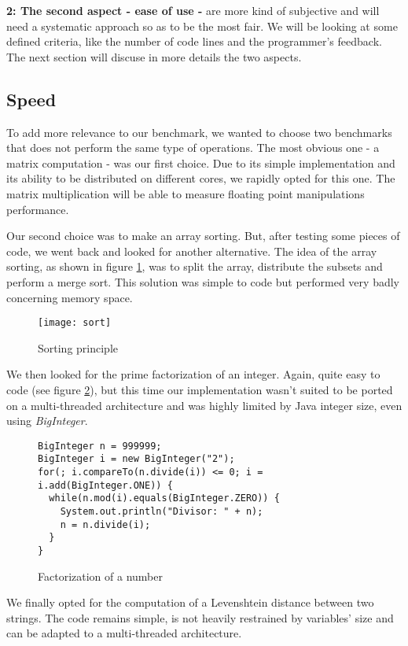 \textbf{2: The second aspect - ease of use -} are more kind of subjective and will need a systematic approach so as to be the most fair. We will be looking at some defined criteria, like the number of code lines and the programmer's feedback. The next section will discuse in more details the two aspects.

\subsection{Speed} \label{subsection speed}

To add more relevance to our benchmark, we wanted to choose two benchmarks that does not perform the same type of operations. The most obvious one - a matrix computation - was our first choice. Due to its simple implementation and its ability to be distributed on different cores, we rapidly opted for this one. The matrix multiplication will be able to measure floating point manipulations performance. 

Our second choice was to make an array sorting. But, after testing some pieces of code, we went back and looked for another alternative. The idea of the array sorting, as shown in figure \ref{fig sort}, was to split the array, distribute the subsets and perform a merge sort. This solution was simple to code but performed very badly concerning memory space.

\begin{figure}[h!]
\centering
\texttt{[image: sort]}
\caption{Sorting principle}
\label{fig sort}
\end{figure}

We then looked for the prime factorization of an integer. Again, quite easy to code (see figure \ref{listing factor}), but this time our implementation wasn't suited to be ported on a multi-threaded architecture and was highly limited by Java integer size, even using \textit{BigInteger}.

\begin{figure}
	\begin{lstlisting}
BigInteger n = 999999;
BigInteger i = new BigInteger("2");
for(; i.compareTo(n.divide(i)) <= 0; i = i.add(BigInteger.ONE)) {
  while(n.mod(i).equals(BigInteger.ZERO)) {
    System.out.println("Divisor: " + n);
    n = n.divide(i);
  }
}
	\end{lstlisting}
\caption{Factorization of a number}
\label{listing factor}
\end{figure}

We finally opted for the computation of a Levenshtein distance between two strings. The code remains simple, is not heavily restrained by variables' size and can be adapted to a multi-threaded architecture.

